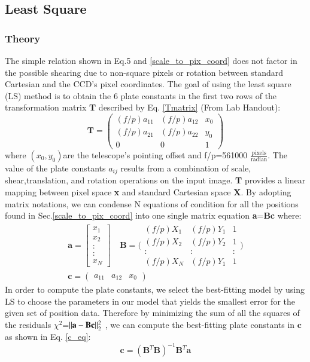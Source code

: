 \documentclass[authoryear, 12pt,5p, times]{elsarticle}
\begin{document}
	\subsection{Least Square}\label{ls}
	\subsubsection{Theory}\label{theory}
	The simple relation shown in Eq.5 and \ref{scale_to_pix_coord} does not factor in the possible shearing due to non-square pixels or rotation between standard Cartesian and the CCD's pixel coordinates. The goal of using the least square (LS) method  is to obtain the 6 plate constants in the first two rows of the transformation matrix \textbf{T} described by Eq. \ref{Tmatrix} (From Lab Handout): 
	\begin{equation}
\textbf{T}=	\begin{pmatrix}
(f/p)a_{11} & (f/p)a_{12} & x_0\\ 
(f/p)a_{21} & (f/p)a_{22} & y_0\\ 
0 &0  & 1
\end{pmatrix}
	\label{Tmatrix}
	\end{equation}
where $(x_0 , y_0)$are the telescope's pointing offset and f/p=561000 $\frac{\textrm{pixels}}{\textrm{radian}}$. 
The value of the plate constants $a_{ij}$ results from a combination of scale, shear,translation, and rotation operations on the input image. \textbf{T} provides a linear mapping between pixel space  \textbf{x} and standard Cartesian space \textbf{X}. By adopting matrix notations, we can condense N equations of condition for all the positions found in Sec.\ref{scale_to_pix_coord} into one single matrix equation \textbf{a}=\textbf{Bc} where: 
\begin{align}
\label{aBc}
\textbf{a}= \begin{bmatrix}
 x_1
\\ x_2
\\:
\\:
\\x_N
\end{bmatrix}
\quad
\textbf{B}=\Bigg(\begin{smallmatrix}
(f/p)X_1 & (f/p)Y_1  & 1\\ 
(f/p)X_2  & (f/p)Y_2  & 1\\ 
: &:  &: \\ 
(f/p)X_N  &(f/p)Y_1   & 1
\end{smallmatrix}\Bigg)
\\
\textbf{c} = \begin{pmatrix}
a_{11} & a_{12} & x_0 
\end{pmatrix}
\end{align}
		In order to compute the plate constants, we select the best-fitting model by using LS to choose the parameters in our model that yields the smallest error for the given set of position data. Therefore by minimizing the sum of all the squares of the residuals $\chi^2$=$\|\textbf{a}-\textbf{Bc}\|^2_{\tiny{2}}$ , we can compute the best-fitting plate constants in $\textbf{c}$ as shown in Eq. \ref{c_eq}:
		\begin{equation}
		\textbf{c} = (\textbf{B}^T\textbf{B})^{-1}\textbf{B}^T\textbf{a}
		\label{c_eq}
		\end{equation}
			
\end{document}
